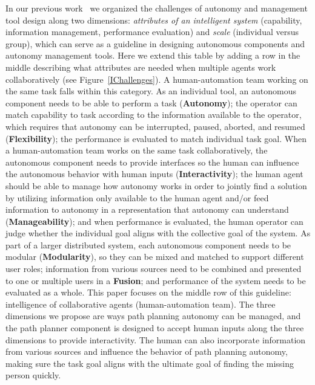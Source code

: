 \documentclass[journal]{IEEEtran}
\begin{document}
In our previous work~\cite{Lin2010Supporting} we organized the challenges of autonomy and management tool design along two dimensions: \textit{attributes of an intelligent system} (capability, information management, performance evaluation) and \textit{scale} (individual versus group), which can serve as a guideline in designing autonomous components and autonomy management tools. Here we extend this table by adding a row in the middle describing what attributes are needed when multiple agents work collaboratively (see Figure~\ref{IChallenges}). A human-automation team working on the same task falls within this category. As an individual tool, an autonomous component needs to be able to perform a task (\textbf{Autonomy}); the operator can match capability to task according to the information available to the operator, which requires that autonomy can be interrupted, paused, aborted, and resumed (\textbf{Flexibility}); the performance is evaluated to match individual task goal. When a human-automation team works on the same task collaboratively, the autonomous component needs to provide interfaces so the human can influence the autonomous behavior with human inputs (\textbf{Interactivity}); the human agent should be able to manage how autonomy works in order to jointly find a solution by utilizing information only available to the human agent and/or feed information to autonomy in a representation that autonomy can understand (\textbf{Manageability}); and when performance is evaluated, the human operator can judge whether the individual goal aligns with the collective goal of the system. As part of a larger distributed system, each autonomous component needs to be modular (\textbf{Modularity}), so they can be mixed and matched to support different user roles; information from various sources need to be combined and presented to one or multiple users in a \textbf{Fusion}; and performance of the system needs to be evaluated as a whole. This paper focuses on the middle row of this guideline: intelligence of collaborative agents (human-automation team). The three dimensions we propose are ways path planning autonomy can be managed, and the path planner component is designed to accept human inputs along the three dimensions to provide interactivity. The human can also incorporate information from various sources and influence the behavior of path planning autonomy, making sure the task goal aligns with the ultimate goal of finding the missing person quickly.
\end{document}
